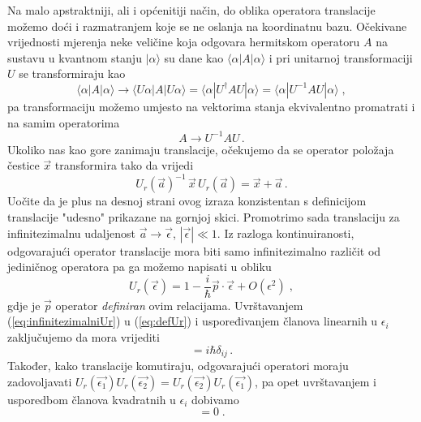 Na malo apstraktniji, ali i općenitiji način, do oblika operatora translacije
možemo doći i razmatranjem koje se ne oslanja na koordinatnu bazu.
Očekivane vrijednosti mjerenja neke veličine koja odgovara hermitskom operatoru $A$
na sustavu u kvantnom stanju $|\alpha\rangle$ 
su dane kao $\langle \alpha | A | \alpha \rangle$ i pri unitarnoj transformaciji $U$
se transformiraju kao 
\begin{equation}
    \langle \alpha | A | \alpha \rangle \to
    \langle U \alpha | A | U \alpha \rangle =
    \langle \alpha | U^{\dagger} A U |  \alpha \rangle =
    \langle \alpha | U^{-1} A U |  \alpha \rangle \;,
\end{equation}
pa transformaciju možemo umjesto na vektorima stanja ekvivalentno promatrati
i na samim operatorima
\begin{equation}
    A \to U^{-1} A U \,.
\end{equation}
Ukoliko nas kao gore zanimaju translacije, očekujemo da se operator položaja
čestice $\vec{x}$ transformira tako da vrijedi
\begin{equation}
    U_{r}(\vec{a})^{-1} \,\vec{x} \, U_{r}(\vec{a}) = \vec{x} + \vec{a} \,.
   \label{eq:defUr}
\end{equation}
Uočite da je plus na desnoj strani ovog izraza konzistentan s definicijom
translacije "udesno" prikazane na gornjoj skici.
Promotrimo sada translaciju za infinitezimalnu udaljenost $\vec{a} \to \vec{\epsilon}$,
$|\vec{\epsilon}| \ll 1$.
Iz razloga kontinuiranosti, odgovarajući operator translacije mora biti
samo infinitezimalno različit od jediničnog operatora pa ga možemo
napisati u obliku
\begin{equation}
    U_{r}(\vec{\epsilon}) = 1 - \frac{i}{\hbar} \vec{p}\cdot\vec{\epsilon} + O(\epsilon^2) \;,
    \label{eq:infinitezimalniUr}
\end{equation}
gdje je $\vec{p}$ operator \emph{definiran} ovim relacijama. Uvrštavanjem
(\ref{eq:infinitezimalniUr}) u (\ref{eq:defUr}) i uspoređivanjem članova
linearnih u $\epsilon_i$ zaključujemo da mora vrijediti
\begin{equation}
    [x_i, p_j] = i\hbar \delta_{ij}\,.
    \label{eq:xpkomutacija}
\end{equation}
Također, kako translacije komutiraju, odgovarajući operatori moraju
zadovoljavati $U_{r}(\vec{\epsilon_1}) U_{r}(\vec{\epsilon_2}) =
U_{r}(\vec{\epsilon_2})U_{r}(\vec{\epsilon_1})$,
pa opet uvrštavanjem i usporedbom članova kvadratnih u $\epsilon_i$
dobivamo
\begin{equation}
    [p_i, p_j] = 0 \;.
    \label{eq:ppkomutacija}
\end{equation}

